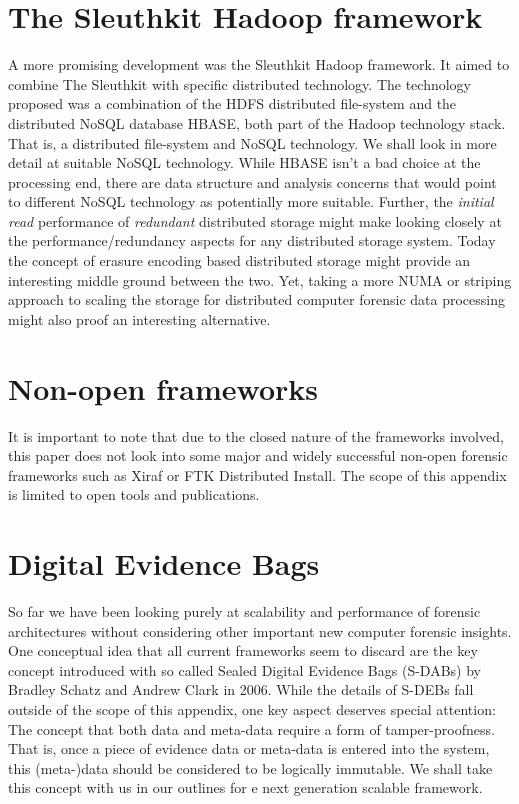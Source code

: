 \section{The Sleuthkit Hadoop framework}
A more promising development was the Sleuthkit Hadoop framework. It aimed to combine The Sleuthkit with specific distributed technology. The technology proposed was a combination of the HDFS distributed file-system and the distributed NoSQL database HBASE, both part of the Hadoop technology stack. That is, a distributed file-system and NoSQL technology. We shall look in more detail at suitable NoSQL technology. While HBASE isn't a bad choice at the processing end, there are data structure and analysis concerns that would point to different NoSQL technology as potentially more suitable. Further, the \emph{initial read} performance of \emph{redundant} distributed storage might make looking closely at the performance/redundancy aspects for any distributed storage system. Today the concept of erasure encoding based distributed storage might provide an interesting middle ground between the two. Yet, taking a more NUMA or striping approach to scaling the storage for distributed computer forensic data processing might also proof an interesting alternative. 
\section{Non-open frameworks}
It is important to note that due to the closed nature of the frameworks involved, this paper does not look into some major and widely successful non-open forensic frameworks such as Xiraf or FTK Distributed Install. The scope of this appendix is limited to open tools and publications.
\section{Digital Evidence Bags}
So far we have been looking purely at scalability and performance of forensic architectures without considering other important new computer forensic insights. One conceptual idea that all current frameworks seem to discard are the key concept introduced with so called Sealed Digital Evidence Bags (S-DABs) by Bradley Schatz and Andrew Clark in 2006. While the details of S-DEBs fall outside of the scope of this appendix, one key aspect deserves special attention: The concept that both data and meta-data require a form of tamper-proofness. That is, once a piece of evidence data or meta-data is entered into the system, this (meta-)data should be considered to be logically immutable. We shall take this concept with us in our outlines for e next generation scalable framework.
